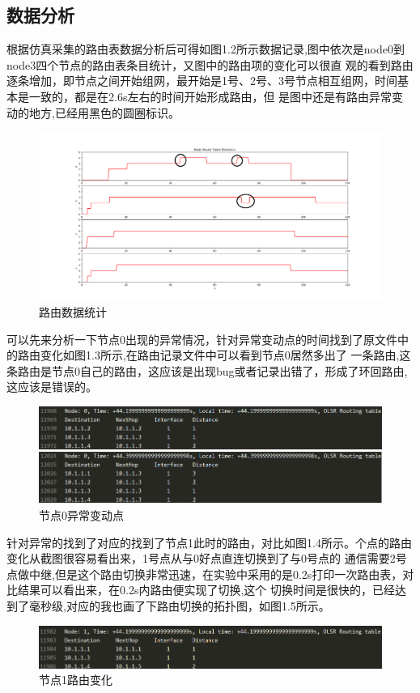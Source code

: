 \documentclass[a4paper,12pt]{report}
\begin{document}
\begin{spacing}{1.5}
\section{数据分析}
根据仿真采集的路由表数据分析后可得如图1.2所示数据记录,图中依次是node0到node3四个节点的路由表条目统计，又图中的路由项的变化可以很直
观的看到路由逐条增加，即节点之间开始组网，最开始是1号、2号、3号节点相互组网，时间基本是一致的，都是在2.6s左右的时间开始形成路由，但
是图中还是有路由异常变动的地方,已经用黑色的圆圈标识。
\begin{figure}[hbtp]
	\centering
	\includegraphics [width=1.0\textwidth]{figure//Figure_1.png}
	\caption{路由数据统计}\label{figure1}
\end{figure}

可以先来分析一下节点0出现的异常情况，针对异常变动点的时间找到了原文件中的路由变化如图1.3所示,在路由记录文件中可以看到节点0居然多出了
一条路由,这条路由是节点0自己的路由，这应该是出现bug或者记录出错了，形成了环回路由,这应该是错误的。
\begin{figure}[hbtp]
	\centering
	\includegraphics [width=1.0\textwidth]{figure//0-1.png}
	\caption{节点0异常变动点}\label{node0}
\end{figure}


针对异常的找到了对应的找到了节点1此时的路由，对比如图1.4所示。个点的路由变化从截图很容易看出来，1号点从与0好点直连切换到了与0号点的
通信需要2号点做中继,但是这个路由切换非常迅速，在实验中采用的是0.2s打印一次路由表，对比结果可以看出来，在0.2s内路由便实现了切换,这个
切换时间是很快的，已经达到了毫秒级,对应的我也画了下路由切换的拓扑图，如图1.5所示。
\begin{figure}[hbtp]
	\centering
	\includegraphics [width=1.0\textwidth]{figure//2-1.png}
	\caption{节点1路由变化}\label{node1}
\end{figure}


\end{spacing}
\end{document}
